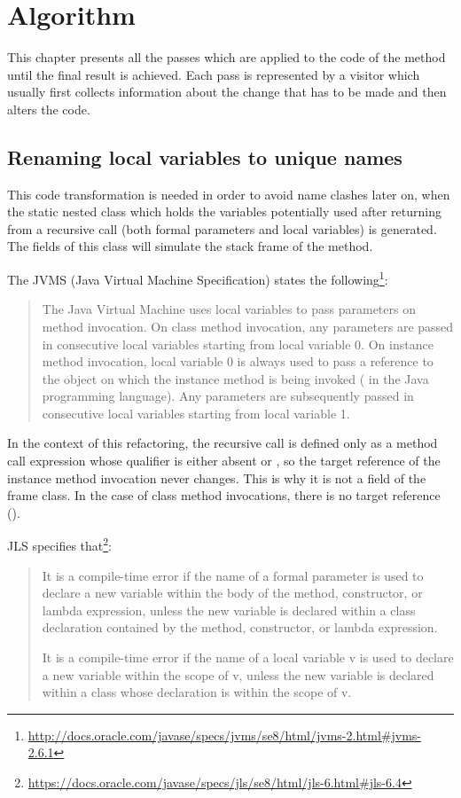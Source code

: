 \chapter{Algorithm}

This chapter presents all the passes which are applied to the code of the method until the final result is achieved.
Each pass is represented by a visitor which usually first collects information about the change that has to be made and
then alters the code.

\section{Renaming local variables to unique names}

This code transformation is needed in order to avoid name clashes later on, when the static nested class which
holds the variables potentially used after returning from a recursive call (both formal parameters and local variables)
is generated. The fields of this class will simulate the stack frame of the method.

The JVMS (Java Virtual Machine Specification) states the
following\footnote{\url{http://docs.oracle.com/javase/specs/jvms/se8/html/jvms-2.html#jvms-2.6.1}}:

\begin{quote}
    The Java Virtual Machine uses local variables to pass parameters on method invocation. On class method invocation,
    any parameters are passed in consecutive local variables starting from local variable 0. On instance method invocation,
    local variable 0 is always used to pass a reference to the object on which the instance method is being invoked
    ( in the Java programming language). Any parameters are subsequently passed in consecutive local
    variables starting from local variable 1.
\end{quote}

In the context of this refactoring, the recursive call is defined only as a method call expression whose qualifier is
either absent or , so the target reference of the instance method invocation never changes. This is why it is
not a field of the frame class. In the case of class method invocations, there is no target reference ().

JLS specifies that\footnote{\url{https://docs.oracle.com/javase/specs/jls/se8/html/jls-6.html#jls-6.4}}:
\begin{quote}
    It is a compile-time error if the name of a formal parameter is used to declare a new variable within the body of
    the method, constructor, or lambda expression, unless the new variable is declared within a class declaration
    contained by the method, constructor, or lambda expression.

    It is a compile-time error if the name of a local variable v is used to declare a new variable within the scope of
    v, unless the new variable is declared within a class whose declaration is within the scope of v.
\end{quote}

